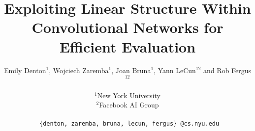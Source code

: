 \documentclass{article} %
\title{Exploiting Linear Structure Within Convolutional Networks
  for Efficient Evaluation}
\author{
Emily Denton$^1$, Wojciech Zaremba$^1$, Joan Bruna$^1$, Yann LeCun$^{12}$ and Rob Fergus$^{12}$\\\\
$^1$New York University\\
$^2$Facebook AI Group\\\\
\texttt{ \{denton, zaremba, bruna, lecun, fergus\} @cs.nyu.edu} \\
}
\begin{document}
\maketitle








\nocite{*}


\end{document}
